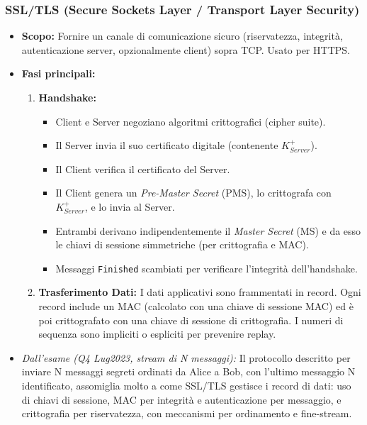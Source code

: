 \subsubsection{SSL/TLS (Secure Sockets Layer / Transport Layer Security)}
\begin{itemize}
    \item \textbf{Scopo:} Fornire un canale di comunicazione sicuro (riservatezza, integrità, autenticazione server, opzionalmente client) sopra TCP. Usato per HTTPS.
    \item \textbf{Fasi principali:}
    \begin{enumerate}
        \item \textbf{Handshake:}
        \begin{itemize}
            \item Client e Server negoziano algoritmi crittografici (cipher suite).
            \item Il Server invia il suo certificato digitale (contenente $K_{Server}^+$).
            \item Il Client verifica il certificato del Server.
            \item Il Client genera un \textit{Pre-Master Secret} (PMS), lo crittografa con $K_{Server}^+$, e lo invia al Server.
            \item Entrambi derivano indipendentemente il \textit{Master Secret} (MS) e da esso le chiavi di sessione simmetriche (per crittografia e MAC).
            \item Messaggi \texttt{Finished} scambiati per verificare l'integrità dell'handshake.
        \end{itemize}
        \item \textbf{Trasferimento Dati:} I dati applicativi sono frammentati in record. Ogni record include un MAC (calcolato con una chiave di sessione MAC) ed è poi crittografato con una chiave di sessione di crittografia. I numeri di sequenza sono impliciti o espliciti per prevenire replay.
    \end{enumerate}
    \item \emph{Dall'esame (Q4 Lug2023, stream di N messaggi):} Il protocollo descritto per inviare N messaggi segreti ordinati da Alice a Bob, con l'ultimo messaggio N identificato, assomiglia molto a come SSL/TLS gestisce i record di dati: uso di chiavi di sessione, MAC per integrità e autenticazione per messaggio, e crittografia per riservatezza, con meccanismi per ordinamento e fine-stream.
\end{itemize}

